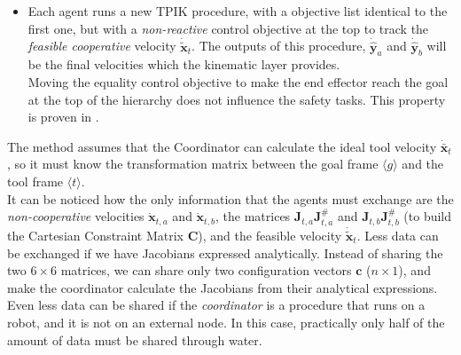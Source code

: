 \begin{itemize}
	\item Each agent runs a new TPIK procedure, with a objective list identical to the first one, but with a \textit{non-reactive} control objective at the top to track the \textit{feasible cooperative} velocity $\dot{\tilde{\boldsymbol{x}}}_t$. The outputs of this procedure, $\dot{\hat{\boldsymbol{y}}}_a$ and $\dot{\hat{\boldsymbol{y}}}_b$ will be the final velocities which the kinematic layer provides.\\
	Moving the equality control objective to make the end effector reach the goal at the top of the hierarchy does not influence the safety tasks. This property is proven in \cite{tesiWander}.
\end{itemize}

The method assumes that the Coordinator can calculate the ideal tool velocity $\dot{\bar{\boldsymbol{x}}}_t$, so it must know the transformation matrix between the goal frame $\langle g \rangle $ and the tool frame $ \langle t \rangle $.\\

It can be noticed how the only information that the agents must exchange are the 
\textit{non-cooperative} velocities $\dot{\boldsymbol{x}}_{t,a}$ and $\dot{\boldsymbol{x}}_{t,b}$, the matrices $\boldsymbol{J}_{t,a} \boldsymbol{J}^{\#}_{t,a}$ and $\boldsymbol{J}_{t,b} \boldsymbol{J}^{\#}_{t,b}$ (to build the Cartesian Constraint Matrix $\boldsymbol{C}$), and the feasible velocity $\dot{\tilde{\boldsymbol{x}}}_t$. Less data can be exchanged if we have Jacobians expressed analytically. Instead of sharing the two $6 \times 6$ matrices, we can share only two configuration vectors $\boldsymbol{c}$ ($n \times 1$), and make the coordinator calculate the Jacobians from their analytical expressions.\\
Even less data can be shared if the \textit{coordinator} is a procedure that runs on a robot, and it is not on an external node. In this case, practically only half of the amount of data must be shared through water.





